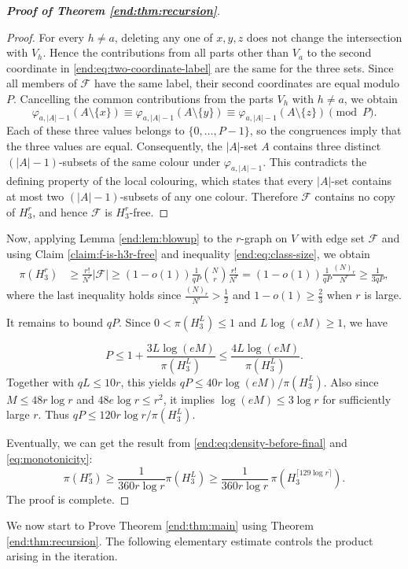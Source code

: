 \documentclass[10pt,a4paper]{amsart}
\numberwithin{equation}{section}
\begin{document}
\begin{proof}[\bfseries{Proof of Theorem \ref{end:thm:recursion}}]
\begin{proof}
For every $h\ne a$, deleting any one of $x,y,z$ does not change the intersection with $V_h$.  Hence the contributions from all parts other than $V_a$ to the second coordinate in \eqref{end:eq:two-coordinate-label} are the same for the three sets.  Since all members of $\mathcal F$ have the same label, their second coordinates are equal modulo $P$.  Cancelling the common contributions from the parts $V_h$ with $h\ne a$, we obtain
$$ \varphi_{a,|A|-1}(A\setminus\{x\})
 \equiv\varphi_{a,|A|-1}(A\setminus\{y\})
 \equiv\varphi_{a,|A|-1}(A\setminus\{z\})\pmod P.$$
Each of these three values belongs to $\{0,\ldots,P-1\}$, so the congruences imply that the three values are equal.  Consequently, the $|A|$-set $A$ contains three distinct $(|A|-1)$-subsets of the same colour under $\varphi_{a,|A|-1}$.  This contradicts the defining property of the local colouring, which states that every $|A|$-set contains at most two $(|A|-1)$-subsets of any one colour.  Therefore $\mathcal F$ contains no copy of $H_3^r$, and hence $\mathcal F$ is $H_3^r$-free.
\end{proof}

Now, applying Lemma \ref{end:lem:blowup} to the $r$-graph on $V$ with edge set $\mathcal F$ and using Claim \ref{claim:f-is-h3r-free} and inequality \eqref{end:eq:class-size}, we obtain
\begin{align}\label{end:eq:density-before-final}
  \pi(H_3^r)&\geq \frac{r!}{N^r}|\mathcal{F}|\ge (1-o(1))\frac{1}{qP}\binom{N}{r}\frac{r!}{N^r}=(1-o(1))\frac{1}{qP}\frac{(N)_r}{N^r}\ge \frac{1}{3qP}, 
\end{align}
where the last inequality holds since $\frac{(N)_r}{N^r}>\frac12$ and $1-o(1)\ge \frac{2}{3}$ when $r$ is large.

It remains to bound $qP$.  Since $0<\pi(H_3^L)\le1$ and $L\log(eM)\ge1$, we have

$$ P\le1+\frac{3L\log(eM)}{\pi(H_3^L)}
 \le\frac{4L\log(eM)}{\pi(H_3^L)}.$$
Together with $qL\le10r$, this yields
$qP\le40r\log(eM)/\pi(H_3^L)$. Also since $M\le48r\log r$ and $48e\log r\le r^2$, it implies $\log(eM)\le3\log r$ for sufficiently large $r$.  Thus
$qP\le120r\log r/\pi(H_3^L)$.
 
Eventually, we can get the result from  \eqref{end:eq:density-before-final} and \eqref{eq:monotonicity}:
$$ \pi(H_3^r)\ge\frac1{360r\log r}\pi(H_3^L)\ge\frac1{360r\log r}\,
 \pi(H_3^{\lceil129\log r\rceil}).$$
The proof is complete.  
\end{proof}

We now start to Prove Theorem \ref{end:thm:main} using Theorem \ref{end:thm:recursion}.  The following elementary estimate controls the product arising in the iteration.
\end{document}
